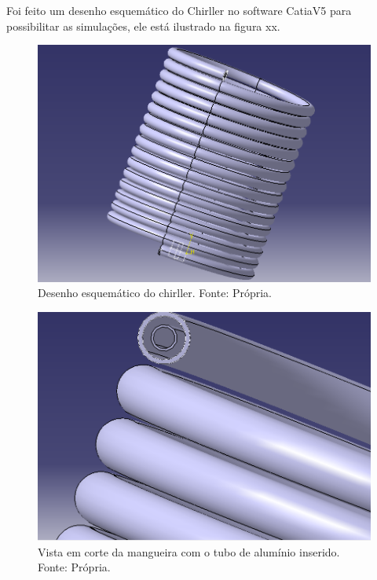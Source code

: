                         Foi feito um desenho esquemático do Chirller no software CatiaV5 para
                        possibilitar as simulações, ele está ilustrado na figura xx.

                        \begin{figure}[!htb]
                            \centering
                            \includegraphics[scale= 0.3]{figuras/desenho-chiller.png}
                            \caption{Desenho esquemático do chirller. Fonte: Própria.}
                            \label{desenho-chiller}
                        \end{figure}

                        \begin{figure}[!htb]
                            \centering
                            \includegraphics[scale= 0.3]{figuras/corte-mangeira.png}
                            \caption{Vista em corte da mangueira com o tubo de alumínio inserido. Fonte: Própria.}
                            \label{vista-mangueira}
                        \end{figure}

